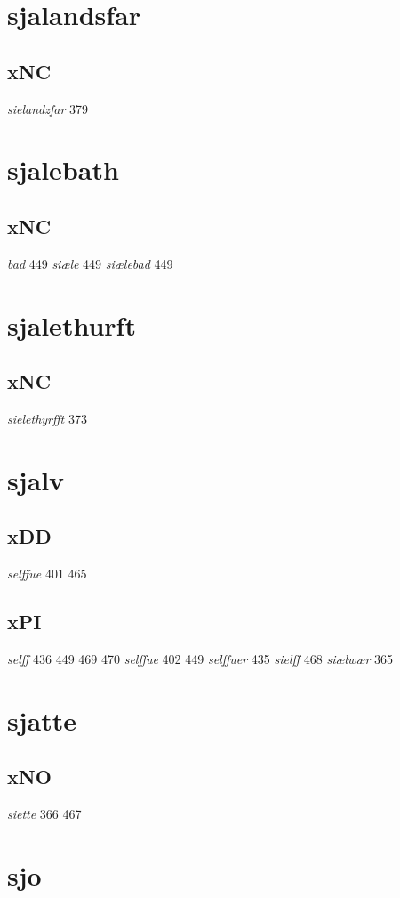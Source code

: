 \documentclass[a4paper,twocolumn]{article}
\begin{document}
\section{sjalandsfar}
\label{sec:org29d98ea}
\subsection{xNC}
\label{sec:orgb2ad505}
\emph{sielandzfar} 379 
\section{sjalebath}
\label{sec:org86a3b98}
\subsection{xNC}
\label{sec:orgfc2709a}
\emph{bad} 449 \emph{siæle} 449 \emph{siælebad} 449 
\section{sjalethurft}
\label{sec:orgbdff378}
\subsection{xNC}
\label{sec:orge59217d}
\emph{sielethyrfft} 373 
\section{sjalv}
\label{sec:org11e62b5}
\subsection{xDD}
\label{sec:org43b32fd}
\emph{selffue} 401 465 
\subsection{xPI}
\label{sec:org7c3c75c}
\emph{selff} 436 449 469 470 \emph{selffue} 402 449 \emph{selffuer} 435 \emph{sielff} 468 \emph{siælwær} 365 
\section{sjatte}
\label{sec:org4a26fe8}
\subsection{xNO}
\label{sec:orgc93c62d}
\emph{siette} 366 467 
\section{sjo}
\label{sec:orgb50a464}
\end{document}

